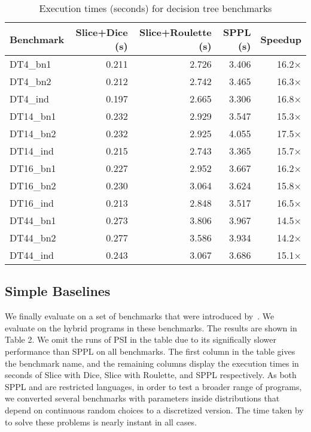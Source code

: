 \begin{table}[!t]
\centering
\begin{tabular}{lrrrr}
\toprule
Benchmark & Slice+Dice (s) & Slice+Roulette (s) & SPPL (s) & Speedup \\
\midrule
DT4\_bn1 & 0.211 & 2.726 & 3.406 & 16.2× \\
DT4\_bn2 & 0.212 & 2.742 & 3.465 & 16.3× \\
DT4\_ind & 0.197 & 2.665 & 3.306 & 16.8× \\
DT14\_bn1 & 0.232 & 2.929 & 3.547 & 15.3× \\
DT14\_bn2 & 0.232 & 2.925 & 4.055 & 17.5× \\
DT14\_ind & 0.215 & 2.743 & 3.365 & 15.7× \\
DT16\_bn1 & 0.227 & 2.952 & 3.667 & 16.2× \\
DT16\_bn2 & 0.230 & 3.064 & 3.624 & 15.8× \\
DT16\_ind & 0.213 & 2.848 & 3.517 & 16.5× \\
DT44\_bn1 & 0.273 & 3.806 & 3.967 & 14.5× \\
DT44\_bn2 & 0.277 & 3.586 & 3.934 & 14.2× \\
DT44\_ind & 0.243 & 3.067 & 3.686 & 15.1× \\
\bottomrule
\end{tabular}
\caption{Execution times (seconds) for decision tree benchmarks}
\end{table}

\subsection{Simple Baselines}\label{sec:baseline-benchmarks}
We finally evaluate \Slice{} on a set of benchmarks that were introduced by~\cite{gehr2016psi}. We evaluate \Slice{} on the hybrid programs in these benchmarks. The results are shown in Table 2. We omit the runs of PSI in the table due to its significally slower performance than SPPL on all benchmarks. The first column in the table gives the benchmark name, and the remaining columns display the execution times in seconds of Slice with Dice, Slice with Roulette, and SPPL respectively. As both SPPL and \Slice{} are restricted languages, in order to test a broader range of programs, we converted several benchmarks with parameters inside distributions that depend on continuous random choices to a discretized version. The time taken by \Slice{} to solve these problems is nearly instant in all cases. 

